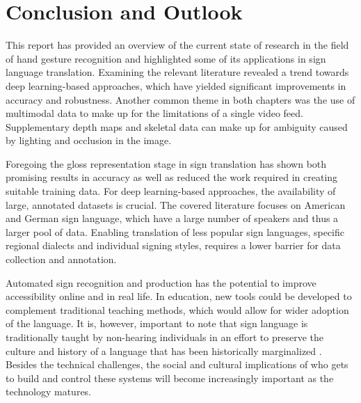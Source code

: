 \chapter{Conclusion and Outlook}

This report has provided an overview of the current state of research in the field of hand gesture recognition and highlighted some of its applications in sign language translation. Examining the relevant literature revealed a trend towards deep learning-based approaches, which have yielded significant improvements in accuracy and robustness. Another common theme in both chapters was the use of multimodal data to make up for the limitations of a single video feed. Supplementary depth maps and skeletal data can make up for ambiguity caused by lighting and occlusion in the image. 


Foregoing the gloss representation stage in sign translation has shown both promising results in accuracy as well as reduced the work required in creating suitable training data. For deep learning-based approaches, the availability of large, annotated datasets is crucial. The covered literature focuses on American and German sign language, which have a large number of speakers and thus a larger pool of data. Enabling translation of less popular sign languages, specific regional dialects and individual signing styles, requires a lower barrier for data collection and annotation. 

Automated sign recognition and production has the potential to improve accessibility online and in real life. In education, new tools could be developed to complement traditional teaching methods, which would allow for wider adoption of the language. It is, however, important to note that sign language is traditionally taught by non-hearing individuals in an effort to preserve the culture and history of a language that has been historically marginalized \cite{ASLTeachingEthics}. Besides the technical challenges, the social and cultural implications of who gets to build and control these systems will become increasingly important as the technology matures.